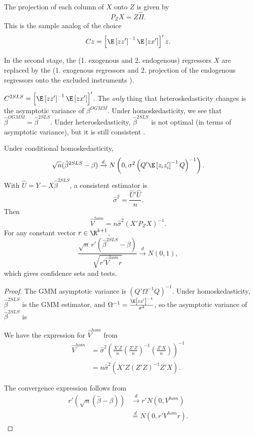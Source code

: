 
The projection of each column of $X$ onto $Z$ is given by \[
	P_Z X = Z \hat{\Pi}
.\] This is the sample analog of the choice \[
	Cz = \left[ \E\left[zz'\right] ^{-1}\E\left[zx'\right]  \right]' z
.\] 

In the second stage, the (1. exogenous and 2. endogenous) regressors $X$ are replaced by the (1. exogenous regressors and 2. projection of the endogenous regressors onto the excluded instruments ).

$C^{2SLS} = \left[ \E\left[zz'\right] ^{-1}\E\left[zx'\right]  \right]'$. The \emph{only} thing that heteroskedasticity changes is the asymptotic variance of $\beta^{OGMM}$. Under homoskedasticity, we see that $\hat{\beta}^{OGMM} = \hat{\beta}^{2SLS}$. Under heteroskedasticity, $\hat{\beta}^{2SLS}$ is not optimal (in terms of asymptotic variance), but it is still consistent .

\begin{proposition}
	Under conditional homoskedasticity, \[
		\sqrt{n}(\hat{\beta}^{2SLS}-\beta) \xrightarrow{d} N\left(0, \sigma^2\left(Q'\E\left[z_i z_i'\right]^{-1}Q\right)^{-1}\right)
	.\]
	With $\hat{U}=Y-X\hat{\beta}^{2SLS}$, a consistent estimator is \[
		\hat{\sigma}^2 = \frac{\hat{U}'\hat{U}}{n}
	.\]
	Then \[
		\hat{V}^{hom} = n\hat{\sigma}^2(X'P_ZX)^{-1}
	.\]
	For any constant vector $r\in\R^{k+1}$, \[
		\frac{\sqrt{n}\,r'\left(\hat{\beta}^{2SLS}-\beta\right)}{\sqrt{r'\hat{V}^{hom}r}} \xrightarrow{d} N(0,1)
	,\]
	which gives confidence sets and tests.
\end{proposition}
\begin{proof}
	The GMM asymptotic variance is $\left( Q'\Omega^{-1}Q \right)^{-1}$. Under homoskedasticity, $\hat{\beta}^{2SLS}$ is the GMM estimator, and $\Omega^{-1} = \frac{\E\left[zz'\right] ^{-1}}{\sigma^2}$, so the asymptotic variance of $\hat{\beta}^{2SLS}$ is 

	We have the expression for $\hat{V}^{hom}$ from 
	\begin{align*}
		\hat{V}^{hom} &= \hat{\sigma}^2 \left( \frac{X'Z}{n}\left( \frac{Z'Z}{n} \right)^{-1} \left( \frac{Z'X}{n} \right) \right)^{-1}\\
		&= n\hat{\sigma}^2 \left( X'Z \left( Z'Z \right)^{-1}Z'X \right)
	.\end{align*}
	
	The convergence expression follows from
	\begin{align*}
		r' \left( \sqrt{n} \left( \hat{\beta} - \beta \right) \right)
		&\xrightarrow{d} r' N\left( 0, V^{hom} \right)\\
		&\overset{d}{=} N\left( 0, r' V^{hom}r \right)
	.\end{align*}
\end{proof}

